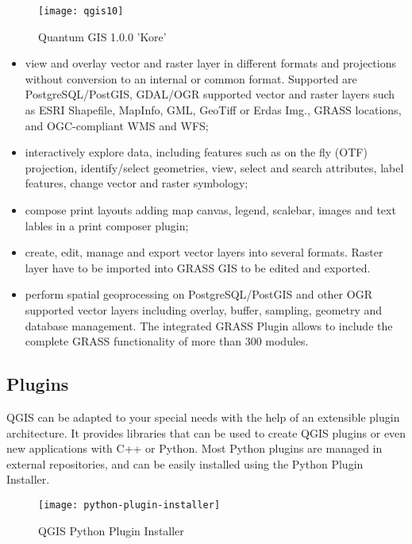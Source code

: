 \begin{figure}[h]
   \begin{center}
   \caption{Quantum GIS 1.0.0 'Kore'}\label{fig:qgis10}\smallskip
   \texttt{[image: qgis10]}
\end{center}
\end{figure}

\begin{itemize}
\item view and overlay vector and raster layer in different formats and
projections without conversion to an internal or common format. Supported are
PostgreSQL/PostGIS, GDAL/OGR supported vector and raster layers such as ESRI
Shapefile, MapInfo, GML, GeoTiff or Erdas Img., GRASS locations, and
OGC-compliant WMS and WFS;
\item interactively explore data, including features such as on the fly
(OTF) projection, identify/select geometries, view, select and search
attributes, label features, change vector and raster symbology; 
\item compose print layouts adding map canvas, legend, scalebar, images and
text lables in a print composer plugin;
\item create, edit, manage and export vector layers into several formats.
Raster layer have to be imported into GRASS GIS to be edited and
exported. 
\item perform spatial geoprocessing on PostgreSQL/PostGIS and other OGR
supported vector layers including overlay, buffer, sampling, geometry and
database management. The integrated GRASS Plugin allows to include the
complete GRASS functionality of more than 300 modules.
\end{itemize}

\subsection{Plugins}

QGIS can be adapted to your special needs with the help of an extensible
plugin architecture. It provides libraries that can be used to create
QGIS plugins or even new applications with C++ or Python. Most Python plugins
are managed in external repositories, and can be easily installed using the
Python Plugin Installer.

\begin{figure}[h]
   \begin{center}
   \caption{QGIS Python Plugin Installer}\label{fig:python-plugin}\smallskip
   \texttt{[image: python-plugin-installer]}
\end{center}
\end{figure}




